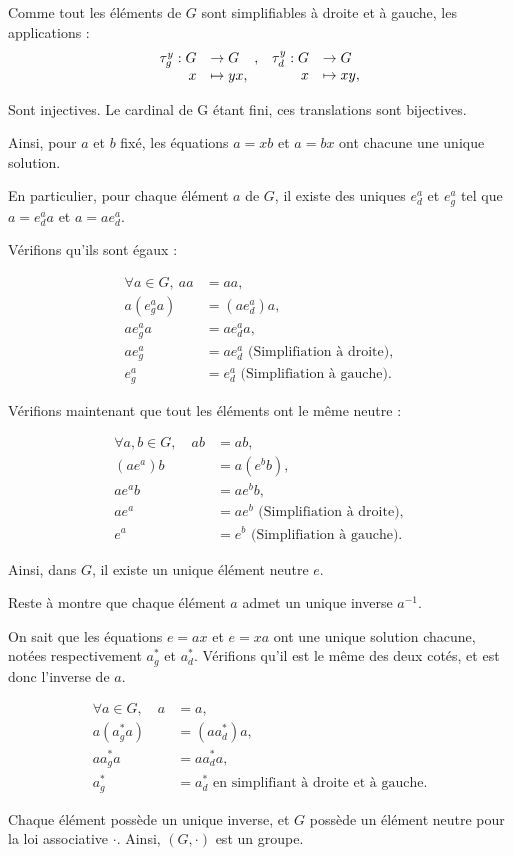 Comme tout les éléments de $G$ sont simplifiables à droite et à gauche, les applications :
\[
\begin{array}[t]{rl}
\tau_g^y : G &\rightarrow G \\
x &\mapsto yx,
\end{array},\ 
\begin{array}[t]{rl}
\tau_d^y : G &\rightarrow G \\
x &\mapsto xy,
\end{array}
\]

Sont injectives. Le cardinal de G étant fini, ces translations sont bijectives.

Ainsi, pour $a$ et $b$ fixé, les équations $a=xb$ et $a=bx$ ont chacune une unique solution.

En particulier, pour chaque élément $a$ de $G$, il existe des uniques $e_d^a$ et $e_g^a$ tel que $a=e_d^a a$ et $a=ae_d^a$.

Vérifions qu'ils sont égaux :

\begin{align*}
    \forall a \in G,\ aa&=aa, \\
    a(e_g^aa) &= (ae_d^a)a, \\
    ae_g^aa &= ae_d^aa, \\
    ae_g^a &= ae_d^a \text{ (Simplifiation à droite)}, \\
    e_g^a &= e_d^a \text{ (Simplifiation à gauche)}.
\end{align*}

Vérifions maintenant que tout les éléments ont le même neutre : 

\begin{align*}
    \forall a, b \in G,\quad ab&=ab,\\
    (ae^a)b &= a(e^bb), \\
    ae^ab &= ae^bb, \\
    ae^a &= ae^b \text{ (Simplifiation à droite)}, \\
    e^a &= e^b \text{ (Simplifiation à gauche)}.
\end{align*}

Ainsi, dans $G$, il existe un unique élément neutre $e$.

Reste à montre que chaque élément $a$ admet un unique inverse $a^{-1}$.

On sait que les équations $e = ax$ et $e = xa$ ont une unique solution chacune, notées respectivement $a^*_g$ et $a^*_d$. Vérifions qu'il est le même des deux cotés, et est donc l'inverse de $a$.

\begin{align*}
    \forall a \in G,\quad a &= a, \\
    a (a^*_g a) &= (a a^*_d) a, \\
    a a^*_g a &= a a^*_d a, \\
    a^*_g &= a^*_d \text{ en simplifiant à droite et à gauche.}
\end{align*}

Chaque élément possède un unique inverse, et $G$ possède un élément neutre pour la loi associative $\cdot$. 
Ainsi, $(G,\cdot)$ est un groupe.